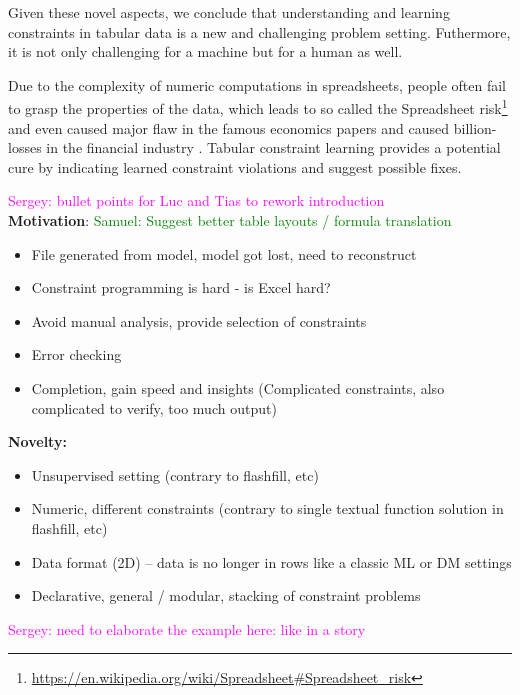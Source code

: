 \documentclass{ecai}
\newcommand{\sergey}[1]{\textcolor{magenta}{{\sc Sergey:} #1}\xspace}
\newcommand{\samuel}[1]{\textcolor{green}{{\sc Samuel:} #1}\xspace}
\begin{document}
Given these novel aspects, we conclude that understanding and learning constraints in tabular data is a new and challenging problem setting.
Futhermore, it is not only challenging for a machine but for a human as well.

Due to the complexity of numeric computations in spreadsheets, people often fail to grasp the properties of the data, which leads to so called the Spreadsheet risk\footnote{\url{https://en.wikipedia.org/wiki/Spreadsheet\#Spreadsheet_risk}} and even caused major flaw in the famous economics papers \cite{flaw_excel} and caused billion-losses in the financial industry \cite{spreadsheet_risk_loss}. Tabular constraint learning provides a potential cure by indicating learned constraint violations and suggest possible fixes.

\sergey{bullet points for Luc and Tias to rework introduction}\\
\textbf{Motivation}:
\samuel{Suggest better table layouts / formula translation}
\begin{itemize}
  \item File generated from model, model got lost, need to reconstruct
  \item Constraint programming is hard - is Excel hard?
  \item Avoid manual analysis, provide selection of constraints
  \item Error checking
  \item Completion, gain speed and insights (Complicated constraints, also complicated to verify, too much output)
\end{itemize}

\textbf{Novelty:}
\begin{itemize}
  \item Unsupervised setting (contrary to flashfill, etc)
  \item Numeric, different constraints (contrary to single textual function solution in flashfill, etc)
  \item Data format (2D) -- data is no longer in rows like a classic ML or DM settings
  \item Declarative, general / modular, stacking of constraint problems
\end{itemize}

\sergey{need to elaborate the example here: like in a story}
\end{document}
